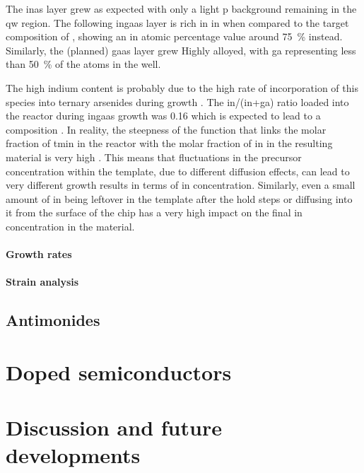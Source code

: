 The \acs{inas} layer grew as expected with only a light \acl{p} background remaining in the \acl{qw} region. The following \acs{ingaas} layer is rich in \acl{in} when compared to the target composition of , showing an \acl{in} atomic percentage value around \qty{75}{\%} instead. Similarly, the (planned) \acs{gaas} layer grew Highly alloyed, with \acl{ga} representing less than \qty{50}{\%} of the atoms in the well. 

The high indium content is probably due to the high rate of incorporation of this species into ternary arsenides during  growth \cite{Borg2019}. The \acs{in}/(\acs{in}+\acs{ga}) ratio loaded into the reactor during \acs{ingaas} growth was \num{0.16} which is expected to lead to a  composition \cite{Borg2019}. In reality, the steepness of the function that links the molar fraction of \acf{tmin} in the reactor with the molar fraction of \acl{in} in the resulting material is very high \cite{Borg2019}. This means that fluctuations in the precursor concentration within the template, due to different diffusion effects, can lead to very different growth results in terms of \acl{in} concentration. Similarly, even a small amount of \acl{in} being leftover in the template after the hold steps or diffusing into it from the surface of the chip has a very high impact on the final \acl{in} concentration in the material.








\paragraph{Growth rates}
\paragraph{Strain analysis}
\subsection{Antimonides}

\section{Doped semiconductors}

\section{Discussion and future developments}







